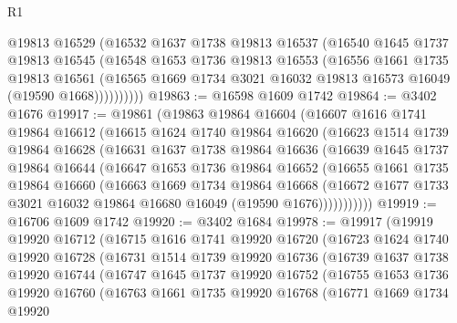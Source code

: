 \begin{lexlean}{R1}
\begin{coremodule}
            @19813
            @16529
            (@16532
              @1637
              @1738
              @19813
              @16537
              (@16540
                @1645
                @1737
                @19813
                @16545
                (@16548
                  @1653
                  @1736
                  @19813
                  @16553
                  (@16556
                    @1661
                    @1735
                    @19813
                    @16561
                    (@16565 @1669 @1734 @3021 @16032 @19813 @16573 @16049 (@19590 @1668))))))))))
@19863 := @16598 @1609 @1742
@19864 := @3402 @1676
@19917 := @19861
    (@19863
      @19864
      @16604
      (@16607
        @1616
        @1741
        @19864
        @16612
        (@16615
          @1624
          @1740
          @19864
          @16620
          (@16623
            @1514
            @1739
            @19864
            @16628
            (@16631
              @1637
              @1738
              @19864
              @16636
              (@16639
                @1645
                @1737
                @19864
                @16644
                (@16647
                  @1653
                  @1736
                  @19864
                  @16652
                  (@16655
                    @1661
                    @1735
                    @19864
                    @16660
                    (@16663
                      @1669
                      @1734
                      @19864
                      @16668
                      (@16672 @1677 @1733 @3021 @16032 @19864 @16680 @16049 (@19590 @1676)))))))))))
@19919 := @16706 @1609 @1742
@19920 := @3402 @1684
@19978 := @19917
    (@19919
      @19920
      @16712
      (@16715
        @1616
        @1741
        @19920
        @16720
        (@16723
          @1624
          @1740
          @19920
          @16728
          (@16731
            @1514
            @1739
            @19920
            @16736
            (@16739
              @1637
              @1738
              @19920
              @16744
              (@16747
                @1645
                @1737
                @19920
                @16752
                (@16755
                  @1653
                  @1736
                  @19920
                  @16760
                  (@16763
                    @1661
                    @1735
                    @19920
                    @16768
                    (@16771
                      @1669
                      @1734
                      @19920

\end{coremodule}
\end{lexlean}
